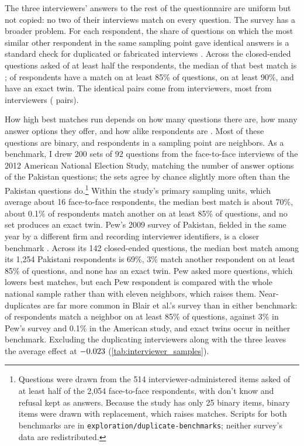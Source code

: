 \documentclass[11pt,letterpaper]{article}
\begin{document}
The three interviewers' answers to the rest of the questionnaire are uniform but not copied: no two of their interviews match on every question. The survey has a broader problem. For each respondent, the share of questions on which the most similar other respondent in the same sampling point gave identical answers is a standard check for duplicated or fabricated interviews \citep{kuriakose2016duped}. Across the \QuestionnaireItems{} closed-ended questions asked of at least half the respondents, the median of that best match is \MatchMedian{}; \MatchEightyFive{} of respondents have a match on at least 85\% of questions, \MatchNinety{} on at least 90\%, and \MatchTwins{} have an exact twin. The \DuplicatePairs{} identical pairs come from \DuplicatingInterviewers{} interviewers, most from interviewers \TopDuplicators{} (\TopDuplicatorPairs{} pairs).

How high best matches run depends on how many questions there are, how many answer options they offer, and how alike respondents are \citep{simmons2016duped}. Most of these questions are binary, and respondents in a sampling point are neighbors. As a benchmark, I drew 200 sets of 92 questions from the face-to-face interviews of the 2012 American National Election Study, matching the number of answer options of the Pakistan questions; the sets agree by chance slightly more often than the Pakistan questions do.\footnote{Questions were drawn from the 514 interviewer-administered items asked of at least half of the 2,054 face-to-face respondents, with don't know and refusal kept as answers. Because the study has only 25 binary items, binary items were drawn with replacement, which raises matches. Scripts for both benchmarks are in \texttt{exploration/duplicate-benchmarks}; neither survey's data are redistributed.} Within the study's primary sampling units, which average about 16 face-to-face respondents, the median best match is about 70\%, about 0.1\% of respondents match another on at least 85\% of questions, and no set produces an exact twin. Pew's 2009 survey of Pakistan, fielded in the same year by a different firm and recording interviewer identifiers, is a closer benchmark \citep{pew2009data}. Across its 142 closed-ended questions, the median best match among its 1,254 Pakistani respondents is 69\%, 3\% match another respondent on at least 85\% of questions, and none has an exact twin. Pew asked more questions, which lowers best matches, but each Pew respondent is compared with the whole national sample rather than with eleven neighbors, which raises them. Near-duplicates are far more common in Blair et al.'s survey than in either benchmark: \MatchEightyFive{} of respondents match a neighbor on at least 85\% of questions, against 3\% in Pew's survey and 0.1\% in the American study, and exact twins occur in neither benchmark. Excluding the duplicating interviewers along with the three leaves the average effect at $-0.023{}$ (\cref{tab:interviewer_samples}).
\end{document}
